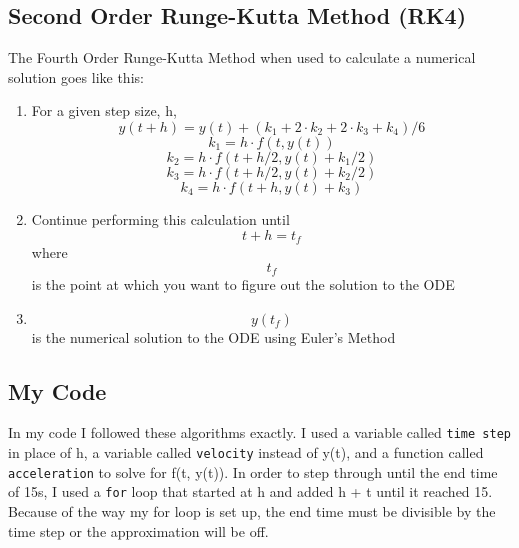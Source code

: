 \documentclass[12pt]{article}
\begin{document}
\subsection{Second Order Runge-Kutta Method (RK4)}\label{sec::table2}
The Fourth Order Runge-Kutta Method when used to calculate a numerical solution goes like this:
\begin{enumerate}
\item For a given step size, h, \begin{equation}
y(t+h) = y(t) + (k_1 + 2 \cdot k_2 + 2 \cdot k_3 + k_4)/6
\end{equation}
\begin{equation}
k_1 = h \cdot f(t,y(t))
\end{equation}
\begin{equation}
k_2 = h \cdot f(t + h/2, y(t) + k_1/2)
\end{equation}
\begin{equation}
k_3 = h \cdot f(t + h/2, y(t) + k_2/2)
\end{equation}
\begin{equation}
k_4 = h \cdot f(t + h, y(t) + k_3)
\end{equation}
\item Continue performing this calculation until \begin{equation}
t+h = t_f
\end{equation} where \begin{equation}
t_f
\end{equation} is the point at which you want to figure out the solution to the ODE 
\item \begin{equation}
y(t_f)
\end{equation} is the numerical solution to the ODE using Euler's Method

\end{enumerate}

\subsection{My Code}\label{sec::table3}
In my code I followed these algorithms exactly. I used a variable called \texttt{time step} in place of h, a variable called \texttt{velocity} instead of y(t), and a function called \texttt{acceleration} to solve for f(t, y(t)). In order to step through until the end time of 15s, I used a \texttt{for} loop that started at h and added h + t until it reached 15. Because of the way my for loop is set up, the end time must be divisible by the time step or the approximation will be off.
\end{document}
